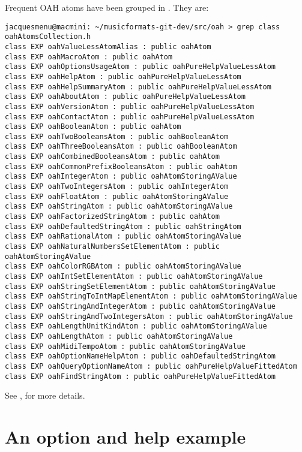 {Frequent OAH atoms have been grouped in . They are:
\begin{lstlisting}[language=Terminal]
jacquesmenu@macmini: ~/musicformats-git-dev/src/oah > grep class   oahAtomsCollection.h
class EXP oahValueLessAtomAlias : public oahAtom
class EXP oahMacroAtom : public oahAtom
class EXP oahOptionsUsageAtom : public oahPureHelpValueLessAtom
class EXP oahHelpAtom : public oahPureHelpValueLessAtom
class EXP oahHelpSummaryAtom : public oahPureHelpValueLessAtom
class EXP oahAboutAtom : public oahPureHelpValueLessAtom
class EXP oahVersionAtom : public oahPureHelpValueLessAtom
class EXP oahContactAtom : public oahPureHelpValueLessAtom
class EXP oahBooleanAtom : public oahAtom
class EXP oahTwoBooleansAtom : public oahBooleanAtom
class EXP oahThreeBooleansAtom : public oahBooleanAtom
class EXP oahCombinedBooleansAtom : public oahAtom
class EXP oahCommonPrefixBooleansAtom : public oahAtom
class EXP oahIntegerAtom : public oahAtomStoringAValue
class EXP oahTwoIntegersAtom : public oahIntegerAtom
class EXP oahFloatAtom : public oahAtomStoringAValue
class EXP oahStringAtom : public oahAtomStoringAValue
class EXP oahFactorizedStringAtom : public oahAtom
class EXP oahDefaultedStringAtom : public oahStringAtom
class EXP oahRationalAtom : public oahAtomStoringAValue
class EXP oahNaturalNumbersSetElementAtom : public oahAtomStoringAValue
class EXP oahColorRGBAtom : public oahAtomStoringAValue
class EXP oahIntSetElementAtom : public oahAtomStoringAValue
class EXP oahStringSetElementAtom : public oahAtomStoringAValue
class EXP oahStringToIntMapElementAtom : public oahAtomStoringAValue
class EXP oahStringAndIntegerAtom : public oahAtomStoringAValue
class EXP oahStringAndTwoIntegersAtom : public oahAtomStoringAValue
class EXP oahLengthUnitKindAtom : public oahAtomStoringAValue
class EXP oahLengthAtom : public oahAtomStoringAValue
class EXP oahMidiTempoAtom : public oahAtomStoringAValue
class EXP oahOptionNameHelpAtom : public oahDefaultedStringAtom
class EXP oahQueryOptionNameAtom : public oahPureHelpValueFittedAtom
class EXP oahFindStringAtom : public oahPureHelpValueFittedAtom
\end{lstlisting}

See , for more details.


\section{An option and help example}

}
